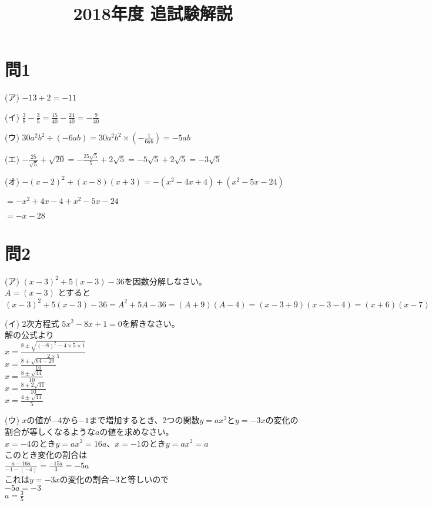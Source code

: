 \documentclass{ltjsarticle}
\begin{document}
\title{2018年度 追試験解説}

\section{問1}

(ア) $-13 + 2 = -11$

(イ) $\frac{3}{8} - \frac{3}{5} = \frac{15}{40} - \frac{24}{40} = -\frac{9}{40}$

(ウ) $30 a^{2} b^{2}\div (-6ab) = 30a^{2}b^{2} \times (-\frac{1}{6ab}) = -5ab$

(エ) $-\frac{25}{\sqrt{5}} + \sqrt{20} = -\frac{25\sqrt{5}}{5} + 2\sqrt{5} = -5\sqrt{5} + 2\sqrt{5} = -3\sqrt{5}$

(オ) $-(x-2)^{2} + (x-8)(x+3) = -(x^{2} - 4x + 4) + (x^{2} - 5x - 24)$

$= -x^{2} + 4x - 4 + x^{2} - 5x - 24$

$= -x - 28$

\section{問2}
(ア) $(x-3)^{2}+5(x-3)-36$を因数分解しなさい。
 \\$ A = (x-3) $ とすると
 \\$(x-3)^{2}+5(x-3)-36 = A^{2} + 5A - 36 = (A+9)(A-4) = (x-3+9)(x-3-4) = (x+6)(x-7)$

(イ) 2次方程式 $ 5x^{2}-8x+1=0 $を解きなさい。
 \\ 解の公式より
 \\ $x=\frac{8\pm\sqrt{(-8)^{2}-4\times5\times1}}{2\times5}$
 \\ $x=\frac{8\pm\sqrt{64-20}}{10}$
 \\ $x=\frac{8\pm\sqrt{44}}{10}$
 \\ $x=\frac{8\pm2\sqrt{11}}{10}$
 \\ $x=\frac{4\pm\sqrt{11}}{5}$

(ウ) $x$の値が$-4$から$-1$まで増加するとき、2つの関数$y=ax^{2}$と$y=-3x$の変化の割合が等しくなるような$a$の値を求めなさい。
 \\ $x=-4$のとき$y=ax^{2}=16a$、$x=-1$のとき$y=ax^{2}=a$
 \\ このとき変化の割合は
 \\ $\frac{a - 16a}{-1 - (-4)} = \frac{-15a}{3} = -5a$
 \\ これは$y=-3x$の変化の割合$-3$と等しいので
 \\ $-5a = -3$
 \\ $a = \frac{3}{5}$
\end{document}
